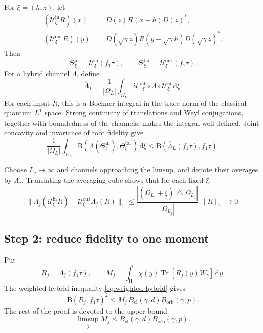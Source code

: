 \documentclass[11pt]{article}
\newcommand{\Hc}{\mathsf H}
\newcommand{\Tr}{\operatorname{Tr}}
\newcommand{\dd}{\,\mathrm d}
\newcommand{\B}{\mathrm B}
\newcommand{\Bcl}{B_{\mathrm{cl}}}
\newcommand{\Borb}{B_{\mathrm{orb}}}
\begin{document}
For $\xi=(h,z)$, let
\begin{align*}
  (\mathcal U_\xi^{\mathrm{in}}R)(x)
  &=D(z)R(x-h)D(z)^*,\\
  (\mathcal U_\xi^{\mathrm{out}}R)(y)
  &=D(\sqrt\gamma z)R(y-\sqrt\gamma h)D(\sqrt\gamma z)^*.
\end{align*}
Then
\[
  \Theta_\xi^{\mathrm{in}}
  =\mathcal U_\xi^{\mathrm{in}}(f_1\tau),
  \qquad
  \Theta_\xi^{\mathrm{tar}}
  =\mathcal U_\xi^{\mathrm{out}}(f_1\tau).
\]
For a hybrid channel $\Lambda$, define
\begin{equation}\label{eq:average}
  \overline\Lambda_L
  =\frac1{|\Omega_L|}\int_{\Omega_L}
  \mathcal U_{-\xi}^{\mathrm{out}}\circ\Lambda\circ
  \mathcal U_\xi^{\mathrm{in}}\dd\xi.
\end{equation}
For each input $R$, this is a Bochner integral in the trace norm of the
classical--quantum $L^1$ space.  Strong continuity of translations and Weyl
conjugations, together with boundedness of the channels, makes the integral
well defined.
Joint concavity and invariance of root fidelity give
\begin{equation}\label{eq:concavity}
  \frac1{|\Omega_L|}\int_{\Omega_L}
  \B(\Lambda(\Theta_\xi^{\mathrm{in}}),
    \Theta_\xi^{\mathrm{tar}})\dd\xi
  \leq\B(\overline\Lambda_L(f_1\tau),f_1\tau).
\end{equation}

Choose $L_j\to\infty$ and channels approaching the limsup, and denote their
averages by $\Lambda_j$.  Translating the averaging cube shows that for each
fixed $\xi$,
\begin{equation}\label{eq:approx-covariance}
  \|\Lambda_j(\mathcal U_\xi^{\mathrm{in}}R)
  -\mathcal U_\xi^{\mathrm{out}}\Lambda_j(R)\|_1
  \leq
  \frac{|(\Omega_{L_j}+\xi)\mathbin\triangle\Omega_{L_j}|}
       {|\Omega_{L_j}|}\,\|R\|_1
  \longrightarrow0.
\end{equation}

\subsection*{Step 2: reduce fidelity to one moment}

Put
\[
  R_j=\Lambda_j(f_1\tau),
  \qquad
  M_j=\int_{\Hc}\chi(y)\Tr[R_j(y)W_\gamma]\dd y.
\]
The weighted hybrid inequality \eqref{eq:weighted-hybrid} gives
\begin{equation}\label{eq:B-to-M}
  \B(R_j,f_1\tau)^2
  \leq M_j\,\Bcl(\gamma,d)\Borb(\gamma,p).
\end{equation}
The rest of the proof is devoted to the upper bound
\begin{equation}\label{eq:M-goal}
  \limsup_j M_j
  \leq\Bcl(\gamma,d)\Borb(\gamma,p).
\end{equation}
\end{document}
